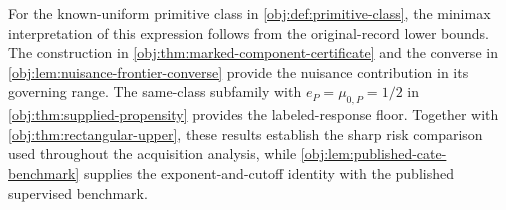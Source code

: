 For the known-uniform primitive class in \cref{obj:def:primitive-class}, the minimax interpretation of this expression follows from the original-record lower bounds. The construction in \cref{obj:thm:marked-component-certificate} and the converse in \cref{obj:lem:nuisance-frontier-converse} provide the nuisance contribution in its governing range. The same-class subfamily with \(e_P=\mu_{0,P}=1/2\) in \cref{obj:thm:supplied-propensity} provides the labeled-response floor. Together with \cref{obj:thm:rectangular-upper}, these results establish the sharp risk comparison used throughout the acquisition analysis, while \cref{obj:lem:published-cate-benchmark} supplies the exponent-and-cutoff identity with the published supervised benchmark.

